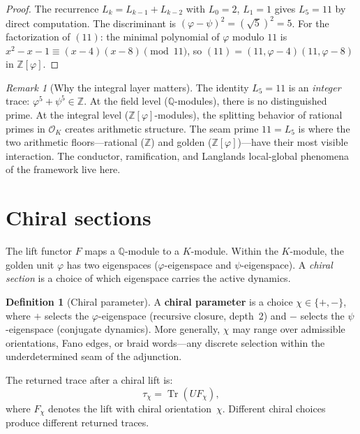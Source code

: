 \documentclass[11pt,a4paper]{article}
\theoremstyle{plain}
\theoremstyle{definition}
\newtheorem{definition}[theorem]{Definition}
\theoremstyle{remark}
\newtheorem{remark}[theorem]{Remark}
\numberwithin{equation}{section}
\providecommand{\Z}{\mathbb{Z}}
\providecommand{\Q}{\mathbb{Q}}
\providecommand{\vp}{\varphi}
\providecommand{\ps}{\psi}
\providecommand{\Lk}{L}
\DeclareMathOperator{\Tr}{Tr}
\begin{document}
\begin{proof}
The recurrence $\Lk_k = \Lk_{k-1} + \Lk_{k-2}$ with $\Lk_0 = 2$,
$\Lk_1 = 1$ gives $\Lk_5 = 11$ by direct computation.  The
discriminant is $(\vp - \ps)^2 = (\sqrt{5})^2 = 5$.  For the
factorization of $(11)$: the minimal polynomial of $\vp$ modulo
$11$ is $x^2 - x - 1 \equiv (x - 4)(x - 8) \pmod{11}$, so
$(11) = (11, \vp - 4)(11, \vp - 8)$ in $\Z[\vp]$.
\end{proof}

\begin{remark}[Why the integral layer matters]
\label{rmk:integral-matters}
The identity $\Lk_5 = 11$ is an \emph{integer} trace:
$\vp^5 + \ps^5 \in \Z$.  At the field level
($\Q$-modules), there is no distinguished prime.  At the integral
level ($\Z[\vp]$-modules), the splitting behavior of rational
primes in $\mathcal{O}_K$ creates arithmetic structure.
The seam prime $11 = \Lk_5$ is where the two arithmetic
floors---rational ($\Z$) and golden ($\Z[\vp]$)---have their
most visible interaction.  The conductor, ramification, and
Langlands local-global phenomena of the framework
\cite{seam,echo-rh} live here.
\end{remark}


\section{Chiral sections}
\label{sec:chirality}

The lift functor $F$ maps a $\Q$-module to a $K$-module.  Within
the $K$-module, the golden unit $\vp$ has two eigenspaces
($\vp$-eigenspace and $\ps$-eigenspace).  A \emph{chiral section}
is a choice of which eigenspace carries the active dynamics.

\begin{definition}[Chiral parameter]
\label{def:chirality}
A \textbf{chiral parameter} is a choice
$\chi \in \{+, -\}$, where $+$ selects the $\vp$-eigenspace
(recursive closure, depth~2) and $-$ selects the
$\ps$-eigenspace (conjugate dynamics).  More generally, $\chi$
may range over admissible orientations, Fano edges, or braid
words---any discrete selection within the underdetermined seam
of the adjunction.
\end{definition}

The returned trace after a chiral lift is:
\[
  \tau_\chi = \Tr(U F_\chi),
\]
where $F_\chi$ denotes the lift with chiral orientation~$\chi$.
Different chiral choices produce different returned traces.
\end{document}

